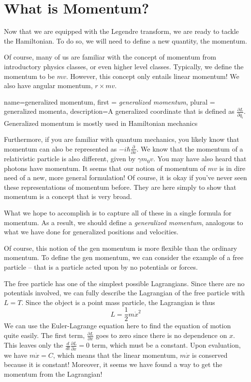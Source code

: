 \section{What is Momentum?}
Now that we are equipped with the Legendre transform, we are ready to tackle the \gls{Hamiltonian}. To do so, we will need to define a new quantity, the momentum.

Of course, many of us are familiar with the concept of momentum from introductory physics classes, or even higher level classes. Typically, we define the momentum to be $mv$. However, this concept only entails linear momentum! We also have angular momentum, $r\times mv$.

{
    name=generalized momentum,
    first = {\textit{generalized momentum}},
    plural = {generalized momenta},
    description={A generalized coordinate that is defined as $\frac{\partial L}{\partial \dot{q}_i}.$ Generalized momentum is mostly used in Hamiltonian mechanics}
}

Furthermore, if you are familiar with quantum mechanics, you likely know that momentum can also be represented as $-i\hbar\frac{\partial}{\partial x}$. We know that the momentum of a relativistic particle is also different, given by $\gamma m_0v$. You may have also heard that photons have momentum. It seems that our notion of momentum of $mv$ is in dire need of a new, more general formulation! Of course, it is okay if you've never seen these representations of momentum before. They are here simply to show that momentum is a concept that is very broad. 

What we hope to accomplish is to capture all of these in a single formula for momentum. As a result, we should define a \textit{generalized momentum}, analogous to what we have done for generalized positions and velocities. 

Of course, this notion of the \gls{gen momentum} is more flexible than the ordinary momentum. To define the \gls{gen momentum}, we can consider the example of a free particle -- that is a particle acted upon by no potentials or forces.

\begin{example}
    The free particle has one of the simplest possible \glspl{Lagrangian}. Since there are no potentials involved, we can fully describe the \gls{Lagrangian} of the free particle with $L=T$. Since the object is a point mass particle, the \gls{Lagrangian} is thus $$L=\frac{1}{2}m\dot{x}^2$$
We can use the Euler-Lagrange equation here to find the equation of motion quite easily. The first term, $\frac{\partial L}{\partial x}$ goes to zero since there is no dependence on $x$. This leaves only the $\frac{d}{dt}\frac{\partial L}{\partial \dot{x}}=0$ term, which must be a constant. Upon evaluation, we have $m\dot{x}=C$, which means that the linear momentum, $m\dot{x}$ is conserved because it is constant! Moreover, it seems we have found a way to get the momentum from the \gls{Lagrangian}!
\end{example}

